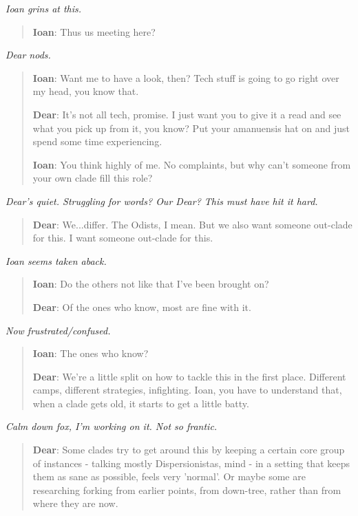 \emph{Ioan grins at this.}

\begin{quote}
\textbf{Ioan}: Thus us meeting here?
\end{quote}

\emph{Dear nods.}

\begin{quote}
\textbf{Ioan}: Want me to have a look, then? Tech stuff is going to go right over my head, you know that.

\textbf{Dear}: It's not all tech, promise. I just want you to give it a read and see what you pick up from it, you know? Put your amanuensis hat on and just spend some time experiencing.

\textbf{Ioan}: You think highly of me. No complaints, but why can't someone from your own clade fill this role?
\end{quote}

\emph{Dear's quiet. Struggling for words? Our Dear? This must have hit it hard.}

\begin{quote}
\textbf{Dear}: We...differ. The Odists, I mean. But we also want someone out-clade for this. I want someone out-clade for this.
\end{quote}

\emph{Ioan seems taken aback.}

\begin{quote}
\textbf{Ioan}: Do the others not like that I've been brought on?

\textbf{Dear}: Of the ones who know, most are fine with it.
\end{quote}

\emph{Now frustrated/confused.}

\begin{quote}
\textbf{Ioan}: The ones who know?

\textbf{Dear}: We're a little split on how to tackle this in the first place. Different camps, different strategies, infighting. Ioan, you have to understand that, when a clade gets old, it starts to get a little batty.
\end{quote}

\emph{Calm down fox, I'm working on it. Not so frantic.}

\begin{quote}
\textbf{Dear}: Some clades try to get around this by keeping a certain core group of instances - talking mostly Dispersionistas, mind - in a setting that keeps them as sane as possible, feels very 'normal'. Or maybe some are researching forking from earlier points, from down-tree, rather than from where they are now.
\end{quote}

